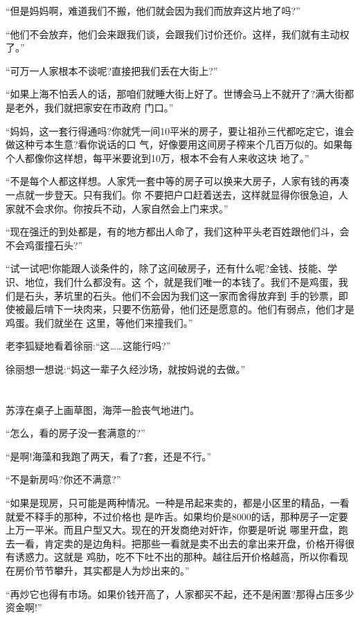 \documentclass[11pt,a4paper,onecolumn]{article}
\begin{document}
``但是妈妈啊，难道我们不搬，他们就会因为我们而放弃这片地了吗?''

``他们不会放弃，他们会来跟我们谈，会跟我们讨价还价。这样，我们就有主动权了。''

``可万一人家根本不谈呢?直接把我们丢在大街上?''

``如果上海不怕丢人的话，那咱们就睡大街上好了。世博会马上不就开了?满大街都是老外，我们就把家安在市政府
门口。''

``妈妈，这一套行得通吗?你就凭一间10平米的房子，要让祖孙三代都吃定它，谁会做这种亏本生意?看你说话的口
气，好像要用这间房子榨来个几百万似的。如果每个人都像你这样想，每平米要讹到10万，根本不会有人来收这块
地了。''

``不是每个人都这样想。人家凭一套中等的房子可以换来大房子，人家有钱的再凑一点就一步登天。只有我们。你
不要把户口赶着送去，这样就显得你很急迫，人家就不会求你。你按兵不动，人家自然会上门来求。''

``现在强迁的到处都是，有的地方都出人命了，我们这种平头老百姓跟他们斗，会不会鸡蛋撞石头?''

``试一试吧!你能跟人谈条件的，除了这间破房子，还有什么呢?金钱、技能、学识、地位，我们什么都没有。这
个，就是我们唯一的本钱了。我们不是鸡蛋，我们是石头，茅坑里的石头。他们不会因为我们这一家而舍得放弃到
手的钞票，即使被最后啃下一块肉来，只要不伤筋骨，他们还是愿意的。他们有弱点，他们才是鸡蛋。我们就坐在
这里，等他们来撞我们。''

老李狐疑地看着徐丽:``这……这能行吗?''

徐丽想一想说:``妈这一辈子久经沙场，就按妈说的去做。''

\section[\thesection]{}

苏淳在桌子上画草图，海萍一脸丧气地进门。

``怎么，看的房子没一套满意的?''

``是啊!海藻和我跑了两天，看了7套，还是不行。''

``不是新房吗?你还不满意?''

``如果是现房，只可能是两种情况。一种是吊起来卖的，都是小区里的精品，一看就爱不释手的那种，不过价格也
是咋舌。如果均价是8000的话，那种房子一定要上万一平米。而且户型又大。现在的开发商绝对奸诈，你要是听说
哪里开盘，跑去一看，肯定卖的是边角料。把那些一看就是卖不出去的拿出来开盘，价格开得很有诱惑力。这就是
鸡肋，吃不下吐不出的那种。越往后开价格越高，所以你看现在房价节节攀升，其实都是人为炒出来的。''

``再炒它也得有市场。如果价钱开高了，人家都买不起，还不是闲置?那得占压多少资金啊!''
\end{document}
